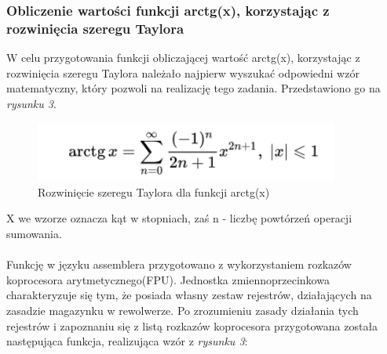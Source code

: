 \documentclass[a4paper,12pt]{article}
\begin{document}
\subsubsection{Obliczenie wartości funkcji arctg(x), korzystając z rozwinięcia szeregu Taylora}
W celu przygotowania funkcji obliczającej wartość arctg(x), korzystając z rozwinięcia szeregu Taylora należało najpierw wyszukać odpowiedni wzór matematyczny, który pozwoli na realizację tego zadania. Przedstawiono go na \textit{rysunku 3}.
\begin{center}
	\begin{figure}[h]
		\centering\includegraphics[width=10cm]{Materialy/Lab5/taylor}
		\caption{Rozwinięcie szeregu Taylora dla funkcji arctg(x)}
		\label{taylor}
	\end{figure}
\end{center}
X we wzorze oznacza kąt w stopniach, zaś n - liczbę powtórzeń operacji sumowania.\\\\
Funkcję w języku assemblera przygotowano z wykorzystaniem rozkazów koprocesora arytmetycznego(FPU). Jednostka zmiennoprzecinkowa charakteryzuje się tym, że posiada własny zestaw rejestrów, działających na zasadzie magazynku w rewolwerze. Po zrozumieniu zasady działania tych rejestrów i zapoznaniu się z listą rozkazów koprocesora przygotowana została następująca funkcja, realizująca wzór z \textit{rysunku 3}:
\end{document}
